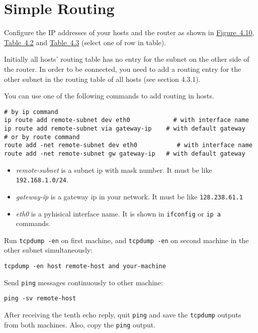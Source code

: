 \documentclass{../UTNetLab}
\begin{document}
\section{Simple Routing}
    Configure the IP addresses of your hosts and the router as shown in \hyperref[fig:4.10]{Figure~4.10}, \hyperref[tab:4.2]{Table~4.2} and \hyperref[tab:4.3]{Table~4.3} (select one of row in table).

    Initially all hosts’ routing table has no entry for the subnet on the other side of the router.
    In order to be connected, you need to add a routing entry for the other subnet in the routing table of all hosts (see section 4.3.1).

    You can use one of the following commands to add routing in hosts.
    \begin{lstlisting}[emph={eth0,gateway-ip,remote-subnet}]
# by ip command
ip route add remote-subnet dev eth0            # with interface name
ip route add remote-subnet via gateway-ip    # with default gateway
# or by route command
route add -net remote-subnet dev eth0           # with interface name
route add -net remote-subnet gw gateway-ip   # with default gateway
    \end{lstlisting}
    \begin{itemize}
        \item \textit{remote-subnet} is a subnet ip with mask number.
                It must be like \lstinline{192.168.1.0/24}.
        \item \textit{gateway-ip} is a gateway ip in your network.
                It must be like \lstinline{128.238.61.1}
        \item \textit{eth0} is a pyhisical interface name.
                It is shown in \lstinline{ifconfig} or \lstinline{ip a} commands.
    \end{itemize}
    

    Run \lstinline{tcpdump -en} on first machine, and \lstinline{tcpdump -en} on second machine in the other subnet simultaneously:
    \begin{lstlisting}[emph={your-machine, remote-host}]
tcpdump -en host remote-host and your-machine
    \end{lstlisting}
    Send \lstinline{ping} messages continuously to other machine:
    \begin{lstlisting}[emph={your-host, remote-host}]
ping -sv remote-host
    \end{lstlisting}
    After receiving the tenth echo reply, quit \lstinline{ping} and save the \lstinline{tcpdump} outputs from both machines.
    Also, copy the \lstinline{ping} output.
\end{document}
